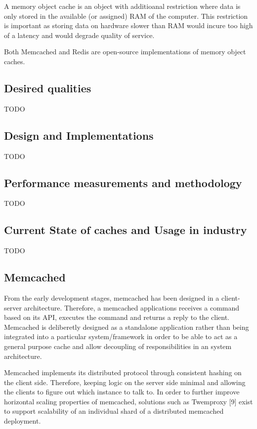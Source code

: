 A memory object cache is an object with additioanal restriction where data is only stored in the available (or assigned) RAM of the computer. This restriction is important as storing data on hardware slower than RAM would incure too high of a latency and would degrade quality of service.

Both Memcached and Redis are open-source implementations of memory object caches.


\subsection{Desired qualities}
TODO

\subsection{Design and Implementations}
TODO

\subsection{Performance measurements and methodology}
TODO

\subsection{Current State of caches and Usage in industry}
TODO

\subsection{Memcached}
From the early development stages, memcached has been designed in a client-server architecture. Therefore, a memcached applications receives a command based on its API, executes the command and returns a reply to the client. Memcached is deliberetly designed as a standalone application rather than being integrated into a particular system/framework in order to be able to act as a general purpose cache and allow decoupling of responsibilities in an system architecture.

Memcached implements its distributed protocol through consistent hashing on the client side. Therefore, keeping logic on the server side minimal and allowing the clients to figure out which instance to talk to. In order to further improve horizontal scaling properties of memcached, solutions such as Twemproxy [9] exist to support scalability of an individual shard of a distributed memcached deployment.


